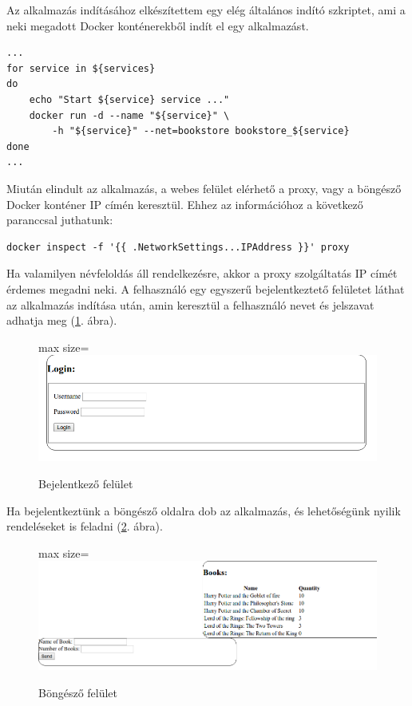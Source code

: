 \documentclass[11pt,magyar,a4paper,twoside,]{report}
\let\Oldincludegraphics\includegraphics
\renewcommand{\includegraphics}[1]{
\begin{adjustbox}{max size={\textwidth}{\textheight}}
    \Oldincludegraphics[scale=0.6]{#1}%
\end{adjustbox}
}
\begin{document}
Az alkalmazás indításához elkészítettem egy elég általános indító
szkriptet, ami a neki megadott Docker konténerekből indít el egy
alkalmazást.

\begin{verbatim}
...
for service in ${services}
do
    echo "Start ${service} service ..."
    docker run -d --name "${service}" \
        -h "${service}" --net=bookstore bookstore_${service}
done
...
\end{verbatim}

Miután elindult az alkalmazás, a webes felület elérhető a proxy, vagy a
böngésző Docker konténer IP címén keresztül. Ehhez az információhoz a
következő paranccsal juthatunk:

\begin{verbatim}
docker inspect -f '{{ .NetworkSettings...IPAddress }}' proxy
\end{verbatim}

Ha valamilyen névfeloldás áll rendelkezésre, akkor a proxy szolgáltatás
IP címét érdemes megadni neki. A felhasználó egy egyszerű
bejelentkeztető felületet láthat az alkalmazás indítása után, amin
keresztül a felhasználó nevet és jelszavat adhatja meg (\ref{login}.
ábra).

\begin{figure}[H]
\centering
\includegraphics{img/loginscreen.png}
\caption{Bejelentkező felület\label{login}}
\end{figure}

Ha bejelentkeztünk a böngésző oldalra dob az alkalmazás, és lehetőségünk
nyilik rendeléseket is feladni (\ref{browse}. ábra).

\begin{figure}[H]
\centering
\includegraphics{img/browsescreen.png}
\caption{Böngésző felület\label{browse}}
\end{figure}
\end{document}
